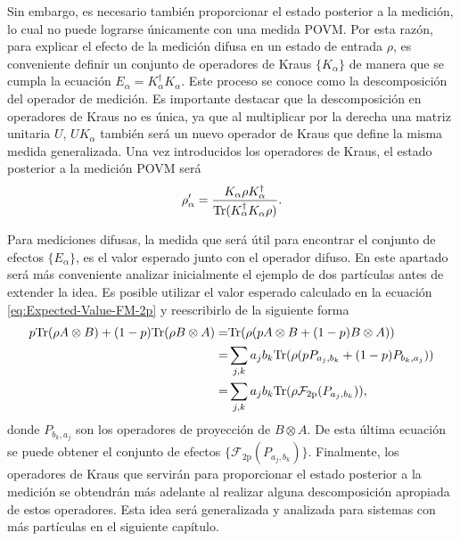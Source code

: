 
Sin embargo, es necesario también proporcionar el estado posterior a la
medición, lo cual no puede lograrse únicamente con una medida POVM\@. Por esta
razón, para explicar el efecto de la medición difusa en un estado de entrada
$\rho$, es conveniente definir un conjunto de operadores de Kraus
$\{K_\alpha\}$ de manera que se cumpla la ecuación $E_\alpha=K_\alpha^\dagger
K_\alpha$. Este proceso se conoce como la descomposición del operador de
medición. Es importante destacar que la descomposición en operadores de Kraus
no es única, ya que al multiplicar por la derecha una matriz unitaria $U$,
$UK_{\alpha}$ también será un nuevo operador de Kraus que define la misma
medida generalizada. Una vez introducidos los operadores de Kraus, el estado
posterior a la medición POVM será 
\begin{equation}
\rho'_\alpha=\dfrac{K_\alpha \rho K_\alpha^\dagger}{{\rm Tr}(K_\alpha^\dagger K_\alpha \rho)}.
\end{equation}


Para mediciones difusas, la medida que será útil para encontrar el conjunto de
efectos $\{E_\alpha\}$, es el valor esperado junto con el operador difuso. En
este apartado será más conveniente analizar inicialmente el ejemplo de dos
partículas antes de extender la idea.  Es posible utilizar el valor esperado
calculado en la ecuación {\eqref{eq:Expected-Value-FM-2p}} y reescribirlo de la
siguiente forma
\begin{equation}\label{eq:ordenar-valoresperado-povm}
\begin{split}
    p{\rm Tr}(\rho A\otimes B)+ (1-p){\rm Tr}(\rho B\otimes A)
    =& {\rm Tr}(\rho (pA\otimes B+(1-p)B\otimes A))\\
    =&\sum_{j,k}{a_j b_k}{\rm Tr}(\rho (pP_{a_j,b_k}+(1-p)P_{b_k, a_j}))\\
    =&\sum_{j, k}{a_j b_k}{\rm Tr}(\rho \mathcal{F}_{2\text{p}}(P_{a_j,b_k})),\\
\end{split}
\end{equation} 
donde $P_{b_k,a_j}$ son los operadores de proyección de $B\otimes A$. De
esta última ecuación se puede obtener el conjunto de efectos
$\{\mathcal{F}_{2\text{p}}(P_{a_j,b_k})\}$. Finalmente, los operadores de Kraus
que servirán para proporcionar el estado posterior a la medición se obtendrán
más adelante al realizar alguna descomposición apropiada de estos operadores.
Esta idea será generalizada y analizada para sistemas con más partículas en el
siguiente capítulo. 

